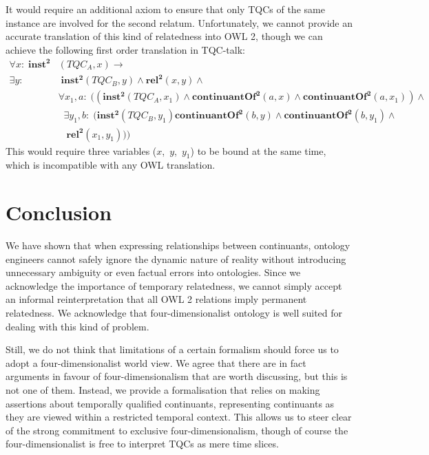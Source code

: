 \documentclass{ao2e}
\newcommand{\mirel}[1]{\ensuremath{\mathrm{\mathbf{#1}}}}
\newcommand{\mclass}[1]{\ensuremath{\mathit{#1}}}
\newcommand{\mrel}[2]{\mirel{#1^#2}}
\newcommand{\mrelb}[1]{\mrel{#1}{2}}
\newcommand{\TQC}[1]{\ensuremath{TQC_{\mclass{#1}}}}
\begin{document}
It would require an additional axiom to ensure that only TQCs of the same instance are involved
for the second relatum. Unfortunately, we cannot provide an
accurate translation of this kind of relatedness into OWL 2, though we can
achieve the following first order translation in TQC-talk:
 \begin{equation}
\begin{split}
\forall x:\; \mrelb{inst}&(\TQC{A},x) \rightarrow \\
 \exists y:&\;\mrelb{inst}(\TQC{B},y) \wedge \mrelb{rel}(x,y)\wedge\\
 & \forall x_1,a:\; ((\mrelb{inst}(\TQC{A},x_1) \wedge 
\mrelb{continuantOf}(a,x) \wedge \mrelb{continuantOf}(a,x_1))\wedge\\
&\;\;\exists y_1,b:\;(\mrelb{inst}(\TQC{B},y_1) \mrelb{continuantOf}(b,y)  
\wedge \mrelb{continuantOf}(b,y_1) \wedge\\&\;\;\;\mrelb{rel}(x_1,y_1)))
\end{split}
\end{equation}
This would require three variables ($x$,~$y$,~$y_1$) to be bound at the same
time, which is incompatible with any OWL translation.


\section{Conclusion}
We have shown that when expressing relationships between continuants, ontology
engineers cannot safely ignore the dynamic nature of reality without introducing
unnecessary ambiguity or even factual errors into ontologies. Since we
acknowledge the importance of temporary relatedness, we cannot simply accept an
informal reinterpretation that all OWL 2 relations imply permanent relatedness. 
We acknowledge that four-dimensionalist ontology is well suited for
dealing with this kind of problem. 

Still, we do not think that limitations of a certain formalism should force us
to adopt a four-dimensionalist world view. We agree that there are in fact
arguments in favour of four-dimensionalism that are worth discussing, but this is not one of them. 
Instead, we provide a formalisation that relies on making assertions about
temporally qualified continuants, representing continuants as they are viewed
within a restricted temporal context. This allows us to steer clear of the strong
commitment to exclusive four-dimensionalism, though of course the
four-dimensionalist is free to interpret TQCs as mere time slices.
\end{document}
